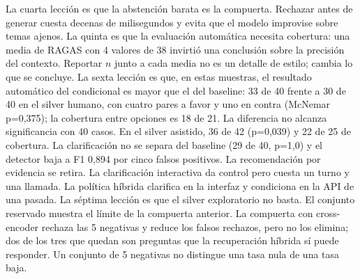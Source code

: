 La cuarta lecci\'on es que la abstenci\'on barata es la compuerta. Rechazar antes de generar cuesta decenas de milisegundos y evita que el modelo improvise sobre temas ajenos. La quinta es que la evaluaci\'on autom\'atica necesita cobertura: una media de RAGAS con 4 valores de 38 invirti\'o una conclusi\'on sobre la precisi\'on del contexto. Reportar $n$ junto a cada media no es un detalle de estilo; cambia lo que se concluye. La sexta lecci\'on es que, en estas muestras, el resultado autom\'atico del condicional es mayor que el del baseline: 33 de 40 frente a 30 de 40 en el silver humano, con cuatro pares a favor y uno en contra (McNemar p=0,375); la cobertura entre opciones es 18 de 21. La diferencia no alcanza significancia con 40 casos. En el silver asistido, 36 de 42 (p=0,039) y 22 de 25 de cobertura. La clarificaci\'on no se separa del baseline (29 de 40, p=1,0) y el detector baja a F1 0,894 por cinco falsos positivos. La recomendaci\'on por evidencia se retira. La clarificaci\'on interactiva da control pero cuesta un turno y una llamada. La pol\'itica h\'ibrida clarifica en la interfaz y condiciona en la API de una pasada. La s\'eptima lecci\'on es que el silver exploratorio no basta. El conjunto reservado muestra el l\'imite de la compuerta anterior. La compuerta con cross-encoder rechaza las 5 negativas y reduce los falsos rechazos, pero no los elimina; dos de los tres que quedan son preguntas que la recuperaci\'on h\'ibrida s\'i puede responder. Un conjunto de 5 negativas no distingue una tasa nula de una tasa baja.


